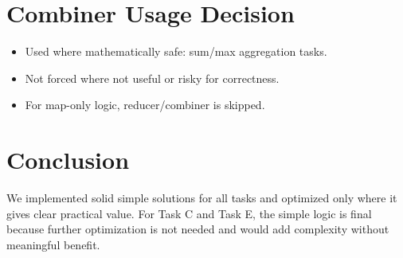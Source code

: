\documentclass[11pt]{article}
\begin{document}
\section{Combiner Usage Decision}
\begin{itemize}
  \item Used where mathematically safe: sum/max aggregation tasks.
  \item Not forced where not useful or risky for correctness.
  \item For map-only logic, reducer/combiner is skipped.
\end{itemize}

\section{Conclusion}
We implemented solid simple solutions for all tasks and optimized only where it gives clear practical value. For Task C and Task E, the simple logic is final because further optimization is not needed and would add complexity without meaningful benefit.
\end{document}
